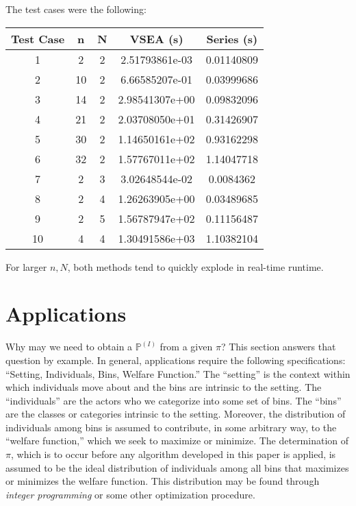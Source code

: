 \documentclass{article}
\begin{document}
The test cases were the following:

\begin{center}
\begin{tabular}{c|c|c|c|c}
    Test Case & n & N & VSEA (s) & Series (s) \\
    \hline
    1 & 2 & 2 & 2.51793861e-03 & 0.01140809 \\
    2 & 10 & 2 & 6.66585207e-01 & 0.03999686 \\
    3 & 14 & 2 & 2.98541307e+00 & 0.09832096 \\
    4 & 21 & 2 & 2.03708050e+01 & 0.31426907 \\
    \hline
    5 & 30 & 2 & 1.14650161e+02 & 0.93162298 \\
    6 & 32 & 2 & 1.57767011e+02 & 1.14047718 \\
    7 & 2 & 3 & 3.02648544e-02 & 0.0084362 \\
    8 & 2 & 4 & 1.26263905e+00 & 0.03489685 \\
    \hline
    9 & 2 & 5 & 1.56787947e+02 & 0.11156487 \\
    10 & 4 & 4 & 1.30491586e+03 & 1.10382104
\end{tabular}
\end{center}

For larger $n,N$, both methods tend to quickly explode in real-time runtime.

\section{Applications}
Why may we need to obtain a $\mathbb{P}^{(I)}$ from a given $\pi$? This section answers that question by example. In general, applications require the following specifications: ``Setting, Individuals, Bins, Welfare Function.'' The ``setting'' is the context within which individuals move about and the bins are intrinsic to the setting. The ``individuals'' are the actors who we categorize into some set of bins. The ``bins'' are the classes or categories intrinsic to the setting. Moreover, the distribution of individuals among bins is assumed to contribute, in some arbitrary way, to the ``welfare function,'' which we seek to maximize or minimize. The determination of $\pi$, which is to occur before any algorithm developed in this paper is applied, is assumed to be the ideal distribution of individuals among all bins that maximizes or minimizes the welfare function. This distribution may be found through \textit{integer programming} or some other optimization procedure.
\end{document}
